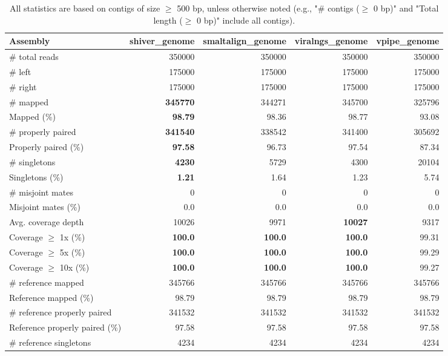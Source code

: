 \documentclass[12pt,a4paper]{article}
\begin{document}
\begin{table}[ht]
\begin{center}
\caption{All statistics are based on contigs of size $\geq$ 500 bp, unless otherwise noted (e.g., "\# contigs ($\geq$ 0 bp)" and "Total length ($\geq$ 0 bp)" include all contigs).}
\begin{tabular}{|l*{4}{|r}|}
\hline
Assembly & shiver\_genome & smaltalign\_genome & viralngs\_genome & vpipe\_genome \\ \hline
\# total reads & 350000 & 350000 & 350000 & 350000 \\ \hline
\# left & 175000 & 175000 & 175000 & 175000 \\ \hline
\# right & 175000 & 175000 & 175000 & 175000 \\ \hline
\# mapped & {\bf 345770} & 344271 & 345700 & 325796 \\ \hline
Mapped (\%) & {\bf 98.79} & 98.36 & 98.77 & 93.08 \\ \hline
\# properly paired & {\bf 341540} & 338542 & 341400 & 305692 \\ \hline
Properly paired (\%) & {\bf 97.58} & 96.73 & 97.54 & 87.34 \\ \hline
\# singletons & {\bf 4230} & 5729 & 4300 & 20104 \\ \hline
Singletons (\%) & {\bf 1.21} & 1.64 & 1.23 & 5.74 \\ \hline
\# misjoint mates & 0 & 0 & 0 & 0 \\ \hline
Misjoint mates (\%) & 0.0 & 0.0 & 0.0 & 0.0 \\ \hline
Avg. coverage depth & 10026 & 9971 & {\bf 10027} & 9317 \\ \hline
Coverage $\geq$ 1x (\%) & {\bf 100.0} & {\bf 100.0} & {\bf 100.0} & 99.31 \\ \hline
Coverage $\geq$ 5x (\%) & {\bf 100.0} & {\bf 100.0} & {\bf 100.0} & 99.29 \\ \hline
Coverage $\geq$ 10x (\%) & {\bf 100.0} & {\bf 100.0} & {\bf 100.0} & 99.27 \\ \hline
\# reference mapped & 345766 & 345766 & 345766 & 345766 \\ \hline
Reference mapped (\%) & 98.79 & 98.79 & 98.79 & 98.79 \\ \hline
\# reference properly paired & 341532 & 341532 & 341532 & 341532 \\ \hline
Reference properly paired (\%) & 97.58 & 97.58 & 97.58 & 97.58 \\ \hline
\# reference singletons & 4234 & 4234 & 4234 & 4234 \\ \hline

\end{tabular}
\end{center}
\end{table}
\end{document}
